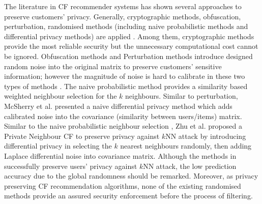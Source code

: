 \documentclass[11pt]{article}
\begin{document}
The literature in CF recommender systems has shown several approaches to preserve customers' privacy. Generally, cryptographic methods, obfuscation, perturbation, randomised methods (including naive probabilistic methods and differential privacy methods) are applied \cite{ZHU2014}. Among them, cryptographic methods \cite{ERKIN2010, NIKOLAENKO2013} provide the most reliable security but the unnecessary computational cost cannot be ignored. Obfuscation methods \cite{PARAMESWARAN2007, WEINSBERG2012} and Perturbation methods \cite{BASU2012, BILGE2012} introduce designed random noise into the original matrix to preserve customers' sensitive information; however the magnitude of noise is hard to calibrate in these two types of methods \cite{DWORK2006B, ZHU2014}. The naive probabilistic method \cite{ADAMOPOULOS2014} provides a similarity based weighted neighbour selection for the $k$ neighbours. Similar to perturbation, McSherry et al. \cite{MCSHERRY2009} presented a naive differential privacy method which adds calibrated noise into the covariance (similarity between users/items) matrix. Similar to the naive probabilistic neighbour selection \cite{ADAMOPOULOS2014}, Zhu et al. \cite{ZHU2014} proposed a Private Neighbour CF to preserve privacy against $k$NN attack by introducing differential privacy in selecting the $k$ nearest neighbours randomly, then adding Laplace differential noise into covariance matrix. Although the methods in \cite{MCSHERRY2009, ZHU2014, ADAMOPOULOS2014} successfully preserve users' privacy against $k$NN attack, the low prediction accuracy due to the global randomness should be remarked. Moreover, as privacy preserving CF recommendation algorithms, none of the existing randomised methods provide an assured security enforcement before the process of filtering.
\end{document}
